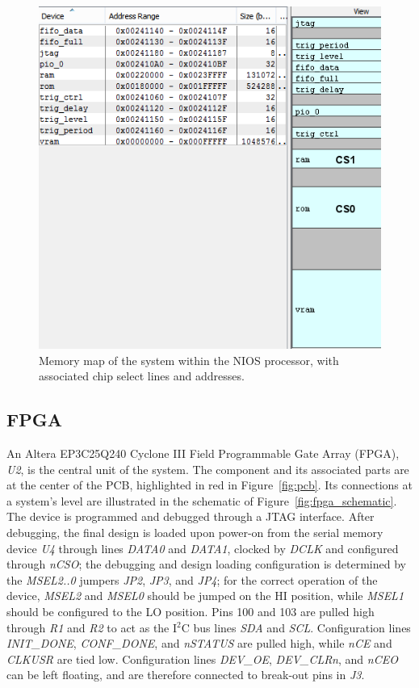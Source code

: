 \documentclass[titlepage]{scrartcl}
\begin{document}
	\begin{figure}[h!]
	\includegraphics[width=\textwidth]{img/memory_map.png}
                	\caption{Memory map of the system within the NIOS processor, with associated chip select lines and addresses.}
               	\label{fig:memory_map}
	\end{figure}

	\clearpage

	\subsection{FPGA \label{sec:fpga}}
	An Altera EP3C25Q240 Cyclone III Field Programmable Gate Array (FPGA), \textit{U2}, is the central unit of the system. The component and its associated parts are at the center of the PCB, highlighted in red in Figure~\ref{fig:pcb}. Its connections at a system's level are illustrated in the schematic of Figure~\ref{fig:fpga_schematic}. The device is programmed and debugged through a JTAG interface. After debugging, the final design is loaded upon power-on from the serial memory device \textit{U4} through lines \textit{DATA0} and \textit{DATA1}, clocked by \textit{DCLK} and configured through \textit{nCSO}; the debugging and design loading configuration is determined by the \textit{MSEL2..0} jumpers \textit{JP2}, \textit{JP3}, and \textit{JP4}; for the correct operation of the device, \textit{MSEL2} and \textit{MSEL0} should be jumped on the HI position, while \textit{MSEL1} should be configured to the LO position. Pins 100 and 103 are pulled high through \textit{R1} and \textit{R2} to act as the I$^2$C bus lines \textit{SDA} and \textit{SCL}. Configuration lines \textit{INIT\_DONE}, \textit{CONF\_DONE}, and \textit{nSTATUS} are pulled high, while \textit{nCE} and \textit{CLKUSR} are tied low. Configuration lines \textit{DEV\_OE}, \textit{DEV\_CLRn}, and \textit{nCEO} can be left floating, and are therefore connected to break-out pins in \textit{J3}.
\end{document}

